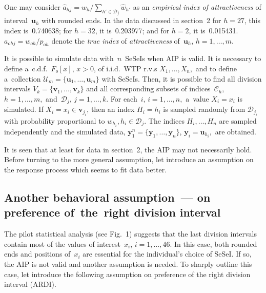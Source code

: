 \begin{multicols}{2}
 One may consider $\hat a_{hj}=\hat w_h/\sum_{h'\in\mathcal{D}_j} \hat w_{h'}$ as an 
 \textit{empirical index of
attractiveness} of interval~$\mathbf{u}_h$ with rounded ends. In the data discussed 
in section~2 for $h=27$,
this index is~0.740638;  for $h=32$, it is~0.203977; and for $h=2$, it is~0.015431.
 $a_{ohj}= w_{oh}/p_{oh}$  denote  the \textit{true index} of 
 \textit{attractiveness} of~$\mathbf{u}_h$, $h=1, \ldots, m.$

It is possible to simulate data with~$n$~SeSeIs when AIP is valid. It is necessary to define
 a~c.d.f.\ $F_o[x]$, $x >0$, of i.i.d.\ WTP r.v.s $X_1, \ldots, X_n,$ and to define a~collection
 $\mathcal{U}_m =\{ \mathbf{u}_1, \ldots, \mathbf{u}_m\} $ with SeSeIs. 
 Then, it is possible to find all
 division intervals $V_k =\{ \mathbf{v}_1 , \ldots, \mathbf{v}_k \} $ and 
 all corresponding subsets of indices~$\mathcal{C}_h$, $h=1, \ldots, m,$ 
 and~$\mathcal{D}_j$, $j=1, \ldots, k.$ For each~$i$, $i=1, \ldots, n,$ 
 a~value $X_i=x_i$ is simulated.
 If $X_i =x_i\in \mathbf{v}_{j_i}$, then an index $H_i =h_i$ is sampled randomly 
 from $\mathcal{D}_{j_i}$ with probability proportional to  $w_{h_i}, h_i\in\mathcal{D}_j.$
 The indices $H_i, \ldots, H_n$ are sampled independently and the simulated data,
 $\mathbf{y}_1^n = \{ \mathbf{y}_1, \ldots, \mathbf{y}_n \}$,  
 $\mathbf{y}_i =\mathbf{u}_{h_i},$ are obtained.

It is seen that at least for  data in section~2, the AIP may not necessarily hold. 
Before turning to the more general assumption,
let introduce an assumption on the response process which seems to fit  data better.

\vspace*{-9pt}

\subsection{Another behavioral assumption~--- on preference of~the~right division interval}

\noindent
The pilot statistical analysis (see Fig.~1) 
 suggests that the last division intervals contain most
 of the values of interest~$x_i$, $i=1, \ldots, 46.$ In this case, both 
 rounded ends and positions of~$x_i$ are
 essential for the individual's choice of SeSeI.  If so, the AIP is not valid and another assumption
 is needed.
  To  sharply outline this case, let introduce the following assumption on preference of the right division interval (ARDI).

\smallskip


\end{multicols}

